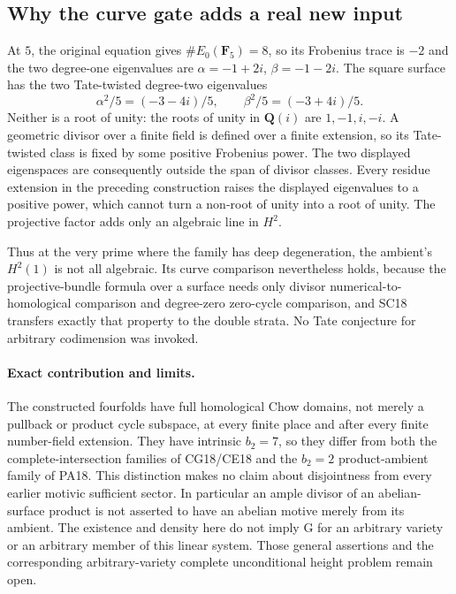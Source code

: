 \subsection{Why the curve gate adds a real new input}

At \(5\), the original equation gives
\(\#E_0(\mathbf F_5)=8\), so its
Frobenius trace is \(-2\) and the
two degree-one eigenvalues are
\(\alpha=-1+2i\), \(\beta=-1-2i\).
The square surface has the two
Tate-twisted degree-two eigenvalues
\[
                       \alpha^2/5=(-3-4i)/5,\qquad
                       \beta^2/5=(-3+4i)/5 .
 \tag{SG18.13}\label{r18sg:nonalgebraic}
\]
Neither is a root of unity:
the roots of unity in \(\mathbf Q(i)\)
are \(1,-1,i,-i\).  A geometric
divisor over a finite field is
defined over a finite extension,
so its Tate-twisted class is
fixed by some positive Frobenius
power.  The two displayed
eigenspaces are consequently
outside the span of divisor
classes.  Every residue extension
in the preceding construction
raises the displayed eigenvalues
to a positive power, which
cannot turn a non-root of unity
into a root of unity.
The projective factor adds only
an algebraic line in \(H^2\).

Thus at the very prime where the
family has deep degeneration,
the ambient's \(H^2(1)\) is
not all algebraic.  Its curve
comparison nevertheless holds,
because the projective-bundle
formula over a surface needs
only divisor numerical-to-homological
comparison and degree-zero
zero-cycle comparison, and SC18
transfers exactly that property
to the double strata.
No Tate conjecture for arbitrary
codimension was invoked.

\paragraph{Exact contribution and limits.}
The constructed fourfolds have
full homological Chow domains,
not merely a pullback or product
cycle subspace, at every finite
place and after every finite
number-field extension.
They have intrinsic \(b_2=7\),
so they differ from both the
complete-intersection families
of CG18/CE18 and the \(b_2=2\)
product-ambient family of PA18.
This distinction makes no claim
about disjointness from every
earlier motivic sufficient sector.
In particular an ample divisor
of an abelian-surface product
is not asserted to have an
abelian motive merely from its
ambient.
The existence and density here
do not imply G for an arbitrary
variety or an arbitrary member
of this linear system.
Those general assertions and
the corresponding arbitrary-variety
complete unconditional height
problem remain open.
